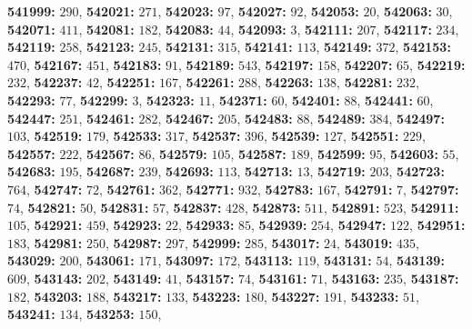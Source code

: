 \textsf{\bfseries 541999:} $290$, \textsf{\bfseries 542021:} $271$, \textsf{\bfseries 542023:} $97$, \textsf{\bfseries 542027:} $92$, \textsf{\bfseries 542053:} $20$, \textsf{\bfseries 542063:} $30$, \textsf{\bfseries 542071:} $411$, \textsf{\bfseries 542081:} $182$, \textsf{\bfseries 542083:} $44$, \textsf{\bfseries 542093:} $3$, \textsf{\bfseries 542111:} $207$, \textsf{\bfseries 542117:} $234$, \textsf{\bfseries 542119:} $258$, \textsf{\bfseries 542123:} $245$, \textsf{\bfseries 542131:} $315$, \textsf{\bfseries 542141:} $113$, \textsf{\bfseries 542149:} $372$, \textsf{\bfseries 542153:} $470$, \textsf{\bfseries 542167:} $451$, \textsf{\bfseries 542183:} $91$, \textsf{\bfseries 542189:} $543$, \textsf{\bfseries 542197:} $158$, \textsf{\bfseries 542207:} $65$, \textsf{\bfseries 542219:} $232$, \textsf{\bfseries 542237:} $42$, \textsf{\bfseries 542251:} $167$, \textsf{\bfseries 542261:} $288$, \textsf{\bfseries 542263:} $138$, \textsf{\bfseries 542281:} $232$, \textsf{\bfseries 542293:} $77$, \textsf{\bfseries 542299:} $3$, \textsf{\bfseries 542323:} $11$, \textsf{\bfseries 542371:} $60$, \textsf{\bfseries 542401:} $88$, \textsf{\bfseries 542441:} $60$, \textsf{\bfseries 542447:} $251$, \textsf{\bfseries 542461:} $282$, \textsf{\bfseries 542467:} $205$, \textsf{\bfseries 542483:} $88$, \textsf{\bfseries 542489:} $384$, \textsf{\bfseries 542497:} $103$, \textsf{\bfseries 542519:} $179$, \textsf{\bfseries 542533:} $317$, \textsf{\bfseries 542537:} $396$, \textsf{\bfseries 542539:} $127$, \textsf{\bfseries 542551:} $229$, \textsf{\bfseries 542557:} $222$, \textsf{\bfseries 542567:} $86$, \textsf{\bfseries 542579:} $105$, \textsf{\bfseries 542587:} $189$, \textsf{\bfseries 542599:} $95$, \textsf{\bfseries 542603:} $55$, \textsf{\bfseries 542683:} $195$, \textsf{\bfseries 542687:} $239$, \textsf{\bfseries 542693:} $113$, \textsf{\bfseries 542713:} $13$, \textsf{\bfseries 542719:} $203$, \textsf{\bfseries 542723:} $764$, \textsf{\bfseries 542747:} $72$, \textsf{\bfseries 542761:} $362$, \textsf{\bfseries 542771:} $932$, \textsf{\bfseries 542783:} $167$, \textsf{\bfseries 542791:} $7$, \textsf{\bfseries 542797:} $74$, \textsf{\bfseries 542821:} $50$, \textsf{\bfseries 542831:} $57$, \textsf{\bfseries 542837:} $428$, \textsf{\bfseries 542873:} $511$, \textsf{\bfseries 542891:} $523$, \textsf{\bfseries 542911:} $105$, \textsf{\bfseries 542921:} $459$, \textsf{\bfseries 542923:} $22$, \textsf{\bfseries 542933:} $85$, \textsf{\bfseries 542939:} $254$, \textsf{\bfseries 542947:} $122$, \textsf{\bfseries 542951:} $183$, \textsf{\bfseries 542981:} $250$, \textsf{\bfseries 542987:} $297$, \textsf{\bfseries 542999:} $285$, \textsf{\bfseries 543017:} $24$, \textsf{\bfseries 543019:} $435$, \textsf{\bfseries 543029:} $200$, \textsf{\bfseries 543061:} $171$, \textsf{\bfseries 543097:} $172$, \textsf{\bfseries 543113:} $119$, \textsf{\bfseries 543131:} $54$, \textsf{\bfseries 543139:} $609$, \textsf{\bfseries 543143:} $202$, \textsf{\bfseries 543149:} $41$, \textsf{\bfseries 543157:} $74$, \textsf{\bfseries 543161:} $71$, \textsf{\bfseries 543163:} $235$, \textsf{\bfseries 543187:} $182$, \textsf{\bfseries 543203:} $188$, \textsf{\bfseries 543217:} $133$, \textsf{\bfseries 543223:} $180$, \textsf{\bfseries 543227:} $191$, \textsf{\bfseries 543233:} $51$, \textsf{\bfseries 543241:} $134$, \textsf{\bfseries 543253:} $150$, 
